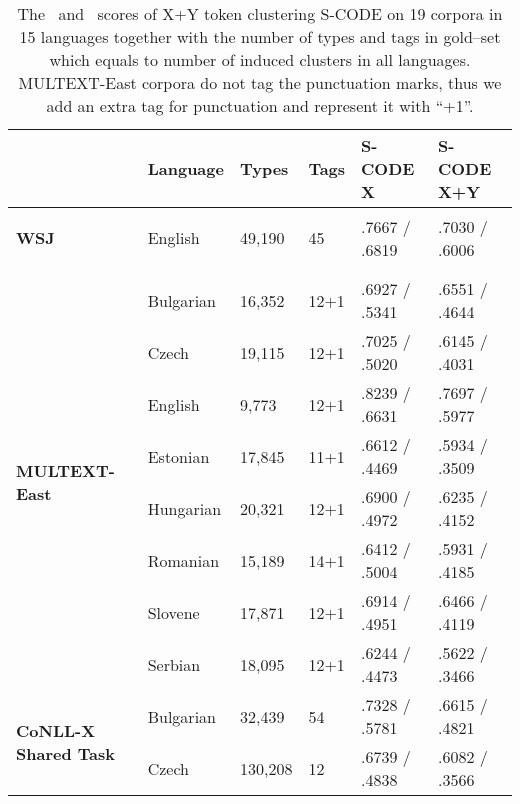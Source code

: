 \begin{table}[ht]
  \centering
  \caption{The \mto\ and \vm\ scores of X+Y token clustering S-CODE on
    19 corpora in 15 languages together with the number of types and
    tags in gold--set which equals to number of induced clusters in
    all languages.  MULTEXT-East corpora do not tag the punctuation
    marks, thus we add an extra tag for punctuation and represent it
    with ``+1''.}
  \begin{tabular}{|l|l|l|l|l|l|}
        \hline
        & Language   & Types    & Tags & S-CODE X & S-CODE X+Y \\ \hline %
        \multirow{1}{*}{\begin{sideways}\textbf{WSJ}\end{sideways}} 
        & English    & 49,190  & 45 & .7667 / .6819 &.7030 / .6006\\
        & & & & &\\ \hline
        \multirow{8}{*}{\begin{sideways}\textbf{MULTEXT-East}\end{sideways}}
        & Bulgarian  & 16,352  & 12+1 & .6927 / .5341 & .6551 / .4644\\
        & Czech      & 19,115  & 12+1 & .7025 / .5020 & .6145 / .4031\\
        & English    & 9,773   & 12+1 & .8239 / .6631 & .7697 / .5977\\
        & Estonian   & 17,845  & 11+1 & .6612 / .4469 & .5934 / .3509\\
        & Hungarian  & 20,321  & 12+1 & .6900 / .4972 & .6235 / .4152\\
        & Romanian   & 15,189  & 14+1 & .6412 / .5004 & .5931 / .4185\\
        & Slovene    & 17,871  & 12+1 & .6914 / .4951 & .6466 / .4119\\
        & Serbian    & 18,095  & 12+1 & .6244 / .4473 & .5622 / .3466\\
        \hline %
        \multirow{10}{*}{\begin{sideways}\textbf{CoNLL-X Shared Task}\end{sideways}}
        & Bulgarian  & 32,439  & 54 & .7328 / .5781 & .6615 / .4821\\
        & Czech      & 130,208 & 12 & .6739 / .4838 & .6082 / .3566\\

\end{tabular}
\end{table}
